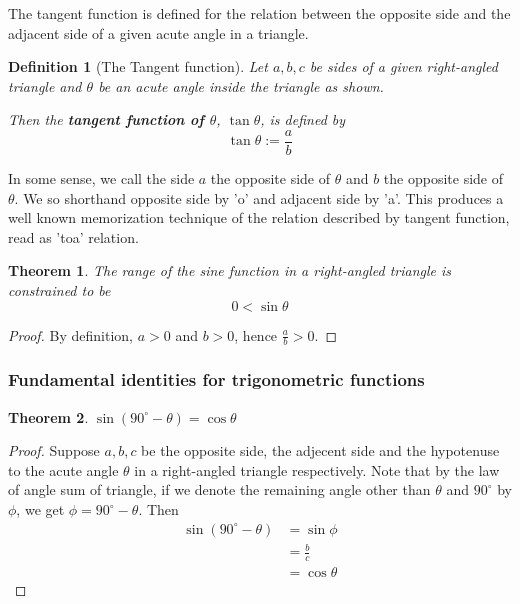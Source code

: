 \documentclass[12pt]{article}
\newtheorem{definition}{Definition}[section]
\newtheorem*{theorem}{Theorem}
\begin{document}
    The tangent function is defined for the relation between the opposite side and the adjacent side of a given acute angle in a triangle.

    \begin{definition}[The Tangent function]
        Let $a,b,c$ be sides of a given right-angled triangle and $\theta$ be an acute angle inside the triangle as shown.

        Then the \textbf{tangent function of $\theta$}, $\tan{\theta}$, is defined by $$\tan{\theta}:=\frac{a}{b}$$
    \end{definition}

    In some sense, we call the side $a$ the opposite side of $\theta$ and $b$ the opposite side of $\theta$. We so shorthand opposite side by 'o' and adjacent side by 'a'. This produces a well known memorization technique of the relation described by tangent function, read as 'toa' relation.

    \begin{theorem}
        The range of the sine function in a right-angled triangle is constrained to be $$0<\sin{\theta}$$
    \end{theorem}

    \begin{proof}
        By definition, $a>0$ and $b>0$, hence $\frac{a}{b}>0$.
    \end{proof}

    \subsubsection{Fundamental identities for trigonometric functions}

    \begin{theorem}
        $\sin(90^\circ - \theta)=\cos{\theta}$
    \end{theorem}

    \begin{proof}
        Suppose $a,b,c$ be the opposite side, the adjecent side and the hypotenuse to the acute angle $\theta$ in a right-angled triangle respectively. Note that by the law of angle sum of triangle, if we denote the remaining angle other than $\theta$ and $90^\circ$ by $\phi$, we get $\phi = 90^\circ - \theta$. Then \begin{align*}
            \sin(90^\circ - \theta) &= \sin{\phi}\\
            &= \frac{b}{c}\\
            &= \cos{\theta}
        \end{align*}
    \end{proof}
\end{document}
